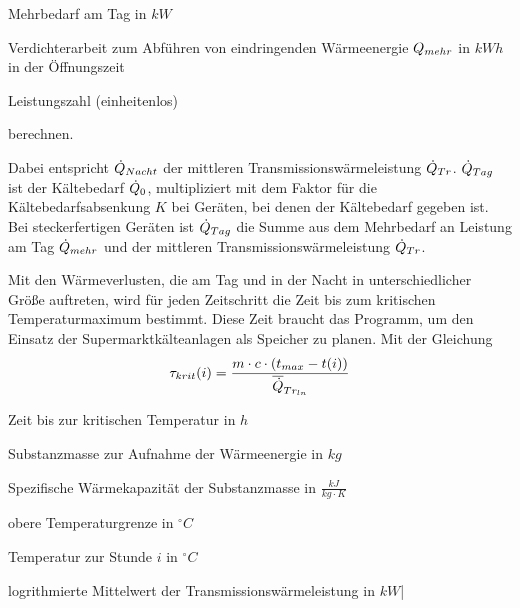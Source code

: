 \begin{description}[\dth]

	\item[$\pmehr$] Mehrbedarf am Tag in $kW$
	\item[$\lmehr$] Verdichterarbeit zum Abführen von eindringenden
		Wärmeenergie $Q_{mehr}$ in $kWh$ in der \"Offnungszeit
	\item[$\epsilon$] Leistungszahl (einheitenlos)

\end{description}
\vspace{0.5cm}
berechnen.

Dabei entspricht $\dot{Q}_{Nacht}$ der mittleren Transmissionswärmeleistung $\dot{Q}_{Tr}$.
$\dot{Q}_{Tag}$ ist der Kältebedarf $\dot{Q}_{0}$, multipliziert mit dem Faktor für die
Kältebedarfsabsenkung $K$ bei Geräten, bei denen der Kältebedarf gegeben ist.
Bei steckerfertigen Geräten ist $\dot{Q}_{Tag}$ die Summe aus dem Mehrbedarf an Leistung
am Tag $\pmehr$ und der mittleren Transmissionswärmeleistung $\dot{Q}_{Tr}$.

Mit den Wärmeverlusten, die am Tag und in der Nacht in unterschiedlicher Größe
auftreten, wird für jeden Zeitschritt die Zeit bis zum kritischen
Temperaturmaximum bestimmt. Diese Zeit braucht das Programm, um den Einsatz der
Supermarktkälteanlagen als Speicher zu planen. Mit der Gleichung
\begin{equation}
	\tau_{krit}(i) = \frac{m \cdot c \cdot (t_{max} -
		t(i))}{\aptranslog}
\label{taukn}
\end{equation}

\begin{description}[\dth]

	\item[$\tau_{krit}$] Zeit bis zur kritischen Temperatur in $h$
	\item[$m$] Substanzmasse zur Aufnahme der Wärmeenergie in $kg$
	\item[$c$] Spezifische Wärmekapazität der Substanzmasse in $\frac{kJ}{kg
		\cdot K}$
	\item[$t_{max}$] obere Temperaturgrenze in $ ^{\circ} C $
	\item[$t(i)$] Temperatur zur Stunde $i$ in $ ^{\circ} C $
	\item[$\aptranslog$] logrithmierte Mittelwert der
		Transmissionswärmeleistung in $kW$|
\end{description}
\vspace{0.5cm}


